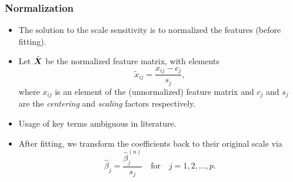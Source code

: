 \documentclass[10pt]{beamer}
\begin{document}
\begin{frame}[c]
  \frametitle{Normalization}

  \begin{itemize}[<+->]
    \item The solution to the scale sensitivity is to normalized the features (before fitting).
    \item Let \(\tilde{\boldsymbol X}\) be the normalized feature matrix, with elements
          \[
            \tilde{x}_{ij} = \frac{x_{ij} - c_{j}}{s_j},
          \]
          where \(x_{ij}\) is an element of the (unnormalized) feature matrix and \(c_j\) and \(s_j\)
          are the \emph{centering} and \emph{scaling} factors respectively.
    \item Usage of key terms ambiguous in literature.
    \item After fitting, we transform the coefficients back to their original scale via
          \[
            \hat\beta_j = \frac{\hat\beta^{(n)}_j}{s_j} \quad\text{for}\quad j = 1,2,\dots,p.
          \]

  \end{itemize}

\end{frame}
\end{document}

